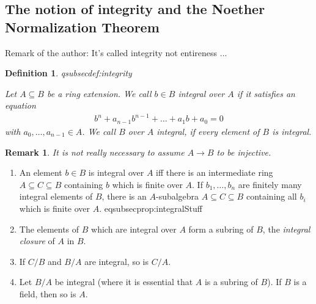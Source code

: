 \documentclass[DIV=14,parskip=full,pointednumbers]{scrartcl}
\newenvironment{alphanumerate}{\begin{enumerate}[label={$(\alph*)$},ref=\curthm]}{\end{enumerate}}
\theoremstyle{cthm}
\theoremstyle{cvarthm}
\theoremstyle{cdef}
\newtheorem{defi}{Definition}[subsection]
\newtheorem{rem}{Remark}[subsection]
\newcommand{\lbl}[1]{
	\label{#1}
	\ifmmode
	\expandafter\xdef\csname eqsubsec#1\endcsname{\thesubsection}
	\fi
}
\newcommand{\ldotspam}{,\ldots,}
\begin{document}
	\subsection{The notion of integrity and the Noether Normalization Theorem}
	Remark of the author: It's called integrity not entireness ...
	\begin{defi}\lbl{def:integrity}
		Let $A\subseteq B$ be a ring extension. We call $b\in B$ \emph{integral} over $A$ if it satisfies an equation
		\begin{align*}
		b^n +a_{n-1}b^{n-1}+\ldots+a_1b+a_0 =0
		\end{align*}
		with $a_0,\ldots,a_{n-1}\in A$. We call $B$ over $A$ \emph{integral}, if every element of $B$ is integral.
	\end{defi}
	\begin{rem}
		It is not really necessary to assume $A\to B$ to be injective.
	\end{rem}
	\begin{prop}
		\begin{alphanumerate}\relax
			\item An element $b\in B$ is integral over $A$ iff there is an intermediate ring $A\subseteq C\subseteq B$ containing $b$ which is finite over $A$. If $b_1\ldotspam b_n$ are finitely many integral elements of $B$, there is an $A$-subalgebra $A\subseteq C\subseteq B$ containing all $b_i$ which is finite over $A$.\lbl{prop:integralStuff}%
			\item The elements of $B$ which are integral over $A$ form a subring of $B$, the \emph{integral closure} of $A$ in $B$.
			\item If $C/B$ and $B/A$ are integral, so is $C/A$.
			\item Let $B/A$ be integral (where it is essential that $A$ is a subring of $B$). If $B$ is a field, then so is $A$.
		\end{alphanumerate}
		
	\end{prop}
	
\end{document}

